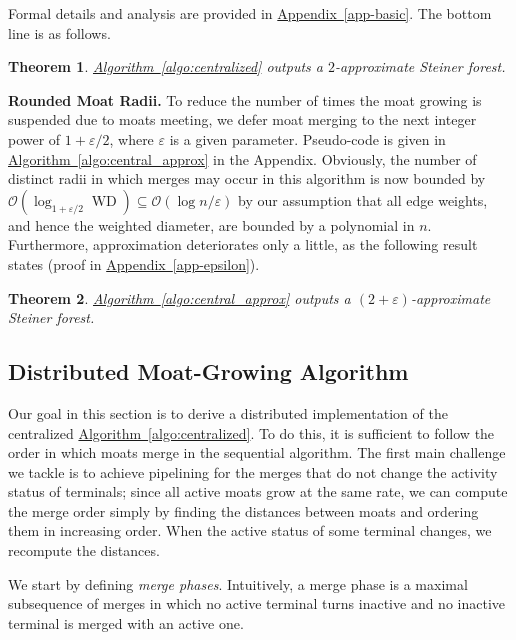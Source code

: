\documentclass[letterpaper,11pt]{article}
\newtheorem{theorem}{Theorem}[section]
\newcommand{\namedref}[2]{\hyperref[#2]{#1~\ref*{#2}}}
\newcommand{\appendixref}[1]{\namedref{Appendix}{#1}}
\newcommand{\appref}[1]{\namedref{Appendix}{#1}}
\newcommand{\algref}[1]{\namedref{Algorithm}{#1}}
\newcommand{\BO}{\mathcal{O}}
\DeclareMathOperator{\WD}{WD}
\renewcommand{\paragraph}[1]{\smallskip\par\noindent\textbf{#1}}
\begin{document}
Formal details and analysis are provided
in \appendixref{app-basic}. The bottom line is as follows.

\begin{theorem}\label{theorem:2approx}
  \algref{algo:centralized} outputs a $2$-approximate Steiner forest.
\end{theorem}



\paragraph{Rounded Moat Radii.}
To reduce the
number of times the moat growing is suspended due to moats meeting, 
we defer moat merging  to the next integer power of
$1+\varepsilon/2$, where $\varepsilon$ is a given
parameter. Pseudo-code is given in 
\algref{algo:central_approx} in the Appendix.
Obviously, the 
number of distinct radii in which merges may occur in this algorithm
is now
bounded by $\BO(\log_{1+\varepsilon/2}\WD)
\subseteq\BO(\log n/\varepsilon)$ by our assumption that all edge weights, and hence
the weighted diameter, are bounded by a polynomial in
$n$. Furthermore, approximation deteriorates only a little, as the
following result  states (proof in
\appref{app-epsilon}). 

\begin{theorem}\label{theorem:2+eps_approx}
\algref{algo:central_approx} outputs a $(2+\varepsilon)$-approximate Steiner
forest.
\end{theorem}



\subsection{Distributed Moat-Growing Algorithm}
\label{ssec-dist}
Our goal in this section is to derive a distributed implementation of the
centralized \algref{algo:centralized}. To do this, it is sufficient to follow
the order in which moats merge in the sequential algorithm. The first main
challenge we tackle is to achieve pipelining for the merges that do not change
the activity status of terminals; since all active moats grow at the same rate,
we can compute the merge order simply by finding the distances between moats and
ordering them in increasing order. When the active status of some terminal
changes, we recompute the distances.


We start by defining \emph{merge phases}. Intuitively, a merge phase is a
maximal subsequence of merges in which no active terminal turns inactive and no
inactive terminal is merged with an active one.
\end{document}
